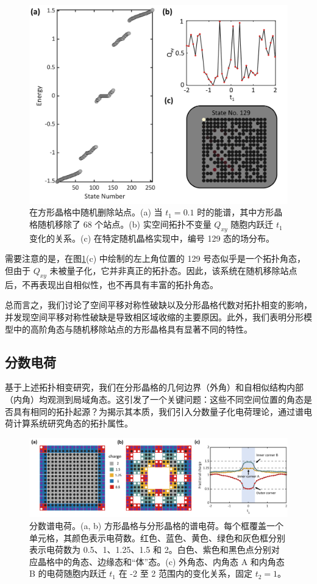 \begin{figure}[htbp]
    \centering
    \includegraphics[width=0.5\linewidth]{figure/HOTITheo/RandDel.png}
    \caption{在方形晶格中随机删除站点。(a) 当 \( t_1=0.1 \) 时的能谱，其中方形晶格随机移除了 68 个站点。(b) 实空间拓扑不变量 \( Q_{xy} \) 随胞内跃迁 \( t_1 \) 变化的关系。(c) 在特定随机晶格实现中，编号 129 态的场分布。}
    \label{fig:RandDel}
\end{figure}

需要注意的是，在图\ref{fig:RandDel}(c) 中绘制的左上角位置的 129 号态似乎是一个拓扑角态，但由于 \( Q_{xy} \) 未被量子化，它并非真正的拓扑态。因此，该系统在随机移除站点后，不再表现出自相似性，也不再具有丰富的拓扑角态。

总而言之，我们讨论了空间平移对称性破缺以及分形晶格代数对拓扑相变的影响，并发现空间平移对称性破缺是导致相区域收缩的主要原因。此外，我们表明分形模型中的高阶角态与随机移除站点的方形晶格具有显著不同的特性。

\subsection{分数电荷}
基于上述拓扑相变研究，我们在分形晶格的几何边界（外角）和自相似结构内部（内角）均观测到局域角态。这引发了一个关键问题：这些不同空间位置的角态是否具有相同的拓扑起源？为揭示其本质，我们引入分数量子化电荷理论\cite{li2020fractional,peterson2021trapped,liu2021bulk}，通过谱电荷计算系统研究角态的拓扑属性。

\begin{figure}[htbp]
    \centering
    \includegraphics[width=1\linewidth]{figure/HOTITheo/Fractional.png}
    \caption{分数谱电荷。(a, b) 方形晶格与分形晶格的谱电荷。每个框覆盖一个单元格，其颜色表示电荷数。红色、蓝色、黄色、绿色和灰色框分别表示电荷数为 0.5、1、1.25、1.5 和 2。白色、紫色和黑色点分别对应晶格中的角态、边缘态和“体”态。(c) 外角态、内角态 A 和内角态 B 的电荷随胞内跃迁 \( t_1 \) 在 -2 至 2 范围内的变化关系，固定 \( t_2 = 1 \)。}
    \label{fig:Fractional}
\end{figure}

